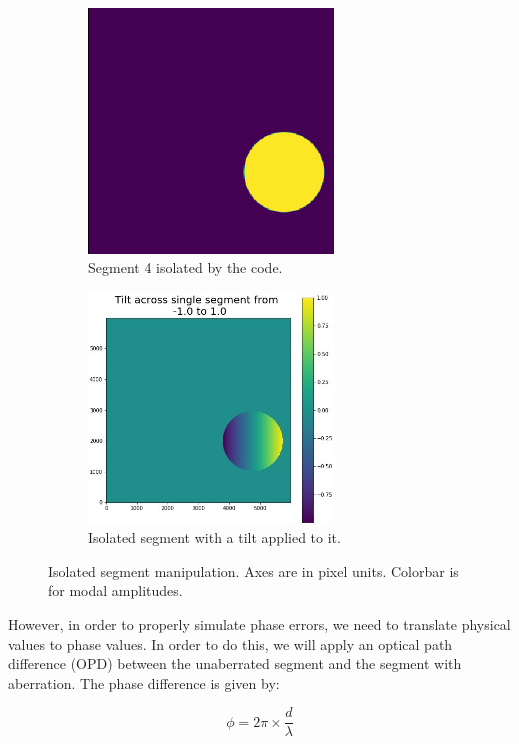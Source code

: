 \begin{figure}[H]
\centering
\begin{subfigure}{.5\textwidth}
  \centering
  \includegraphics[width=6.5cm]{Figures/isolated_seg.png}
  \caption{Segment 4 isolated by the code.}
  \label{fig:single_seg}
\end{subfigure}%
\begin{subfigure}{.5\textwidth}
  \centering
  \includegraphics[width=6.5cm]{Figures/tip_single_seg.jpg}
  \caption{Isolated segment with a tilt applied to it.}
  \label{fig:tilt_seg}
\end{subfigure}
\caption{Isolated segment manipulation.  Axes are in pixel units.  Colorbar is for modal amplitudes.}
\label{fig:isolated_seg}
\end{figure}

However, in order to properly simulate phase errors, we need to translate physical values to phase values.
In order
to do this, we will apply an optical path difference (OPD) between the unaberrated segment and the segment with
aberration.  The phase difference is given by:

\begin{equation}
    \phi = 2 \pi \times \frac{d}{\lambda}
    \label{eq:OPD}
\end{equation}

